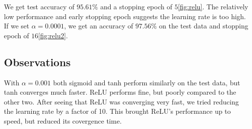 We get test accuracy of $95.61\%$ and a stopping epoch of $5$\cref{fig:relu}. The relatively
low performance and early stopping epoch suggests the learning rate is too high. If we set
$\alpha = 0.0001$, we get an accuracy of $97.56\%$ on the test data and stopping
epoch of $16$\cref{fig:relu2}.

\subsection{Observations}

With $\alpha = 0.001$ both sigmoid and tanh perform similarly on the test data, but
tanh converges much faster. ReLU performs fine, but poorly compared to the other two.
After seeing that ReLU was converging very fast, we tried reducing the learning rate
by a factor of 10. This brought ReLU's performance up to speed, but reduced its covergence time.
